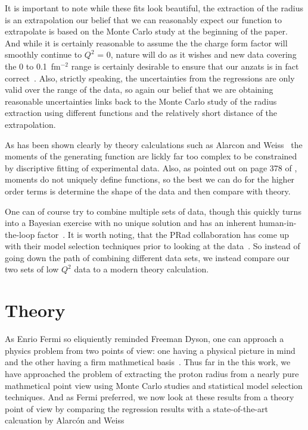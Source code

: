 \documentclass[10pt,aps,prc,twocolumn]{revtex4-1}
\begin{document}
It is important to note while these fits look beautiful, the extraction of the radius is an
extrapolation our belief that we can reasonably expect our function to extrapolate is based
on the Monte Carlo study at the beginning of the paper.    And while it is certainly reasonable
to assume the the charge form factor will smoothly continue to $Q^2$ = 0,
nature will do as it wishes and new data covering the 0 to 0.1~fm$^{-2}$ range is 
certainly desirable to ensure that our anzats is in fact correct~\cite{Gasparian:2014rna,
Peng:2016szv, Mihovilovic:2016rkr}.   
Also, strictly speaking, the
uncertainties from the regressions are only valid over the range of the data, so again our 
belief that we are obtaining reasonable uncertainties links back to the Monte Carlo study of the
radius extraction using different functions and the relatively short distance of the extrapolation.

As has been shown clearly by theory calculations
such as Alarcon and Weiss~\cite{Alarcon:2017lhg,Alarcon:2018irp}
the moments of the generating function are lickly far too complex to be constrained
by discriptive fitting of experimental data.  Also, as pointed out on page 378 of \cite{Sirca:2016}, 
moments do not uniquely define functions, so the best
we can do for the higher order terms is determine the shape of the data and then compare with theory.

One can of course try to combine multiple sets of data, though this quickly turns into a Bayesian exercise
with no unique solution and has an inherent human-in-the-loop factor~\cite{Daee:2018:UMA:3172944.3172989}.
It is worth noting, that the PRad collaboration has come up with their model selection techniques
prior to looking at the data~\cite{Yan:2018bez}.    So instead of going down the path of combining different
data sets, we instead compare our two sets of low $Q^2$ data to a modern theory calculation.

\section{Theory}

As Enrio Fermi so eliquiently reminded Freeman Dyson, one can approach a physics problem from two points
of view: one having a physical picture in mind and the other having a firm mathmetical basis~\cite{Dyson:2004}.  
Thus far in the this work, we have approached the problem of extracting the proton radius from a nearly pure 
mathmetical point view using Monte Carlo studies and statistical model selection techniques.  
And as Fermi preferred, we now look at these results from a theory point of view by comparing the 
regression results with a state-of-the-art calcuation by Alarc\'{o}n and 
Weiss~\cite{Alarcon:2018irp,Alarcon:2017ivh,Alarcon:2017chi,Alarcon:2017lhg,Alarcon:2012kn}
\end{document}

